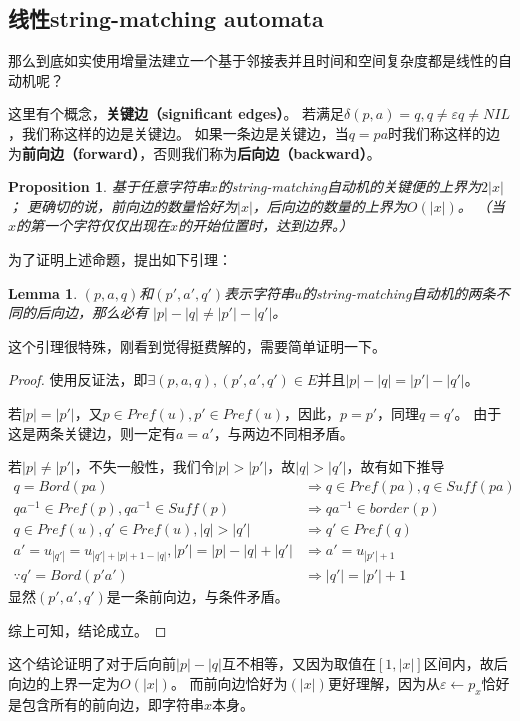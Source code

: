 \documentclass[UTF8]{ctexart}
\newtheorem{lem}[thm]{Lemma}
\newtheorem{prop}[thm]{Proposition}
\theoremstyle{definition}
\theoremstyle{remark}
\numberwithin{equation}{subsection}
\newcommand{\Emph}{\textbf}
\newcommand{\Suff}{\textit{Suff}}
\begin{document}
\subsection{线性string-matching automata}
	
	那么到底如实使用增量法建立一个基于邻接表并且时间和空间复杂度都是线性的自动机呢？
	
	这里有个概念，\Emph{关键边（significant edges）}。
	若满足$\delta(p,a)=q, q \neq \varepsilon q \neq NIL$，我们称这样的边是关键边。
	如果一条边是关键边，当$q=pa$时我们称这样的边为\Emph{前向边（forward）}，否则我们称为\Emph{后向边（backward）}。
	
	\begin{prop}
		基于任意字符串$x$的string-matching自动机的关键便的上界为$2|x|$；
		更确切的说，前向边的数量恰好为$|x|$，后向边的数量的上界为$O(|x|)$。
		（当$x$的第一个字符仅仅出现在$x$的开始位置时，达到边界。）
	\end{prop}
	为了证明上述命题，提出如下引理：
	\begin{lem}
		$(p,a,q)$和$(p',a',q')$表示字符串$u$的string-matching自动机的两条不同的后向边，那么必有
		$|p| - |q| \neq |p'| - |q'|$。
	\end{lem}
	这个引理很特殊，刚看到觉得挺费解的，需要简单证明一下。
	\begin{proof}
		使用反证法，即$\exists (p,a,q),(p',a',q') \in E$并且$|p|-|q| = |p'|-|q'|$。
		
		若$|p|=|p'|$，又$p \in Pref(u), p' \in Pref(u)$，因此，$p = p'$，同理$q = q'$。
		由于这是两条关键边，则一定有$a=a'$，与两边不同相矛盾。
		
		若$|p| \neq |p'|$，不失一般性，我们令$|p| > |p'|$，故$|q| > |q'|$，故有如下推导
		\begin{align*}
			q = Bord(pa)	&\Rightarrow q \in Pref(pa), q \in \Suff(pa)	\\
			qa^{-1} \in Pref(p), qa^{-1} \in \Suff(p)	&\Rightarrow qa^{-1} \in border(p)	\\
			q \in Pref(u), q' \in Pref(u), |q|>|q'| &\Rightarrow q' \in Pref(q)	\\
			a' = u_{|q'|} = u_{|q'|+|p|+1-|q|}, |p'|=|p|-|q|+|q'| &\Rightarrow a' = u_{|p'|+1}	\\
			\because q' = Bord(p'a') &\Rightarrow |q'|=|p'|+1
		\end{align*}
		显然$(p',a',q')$是一条前向边，与条件矛盾。
		
		综上可知，结论成立。
	\end{proof}
	这个结论证明了对于后向前$|p|-|q|$互不相等，又因为取值在$[1,|x|]$区间内，故后向边的上界一定为$O(|x|)$。
	而前向边恰好为$(|x|)$更好理解，因为从$\varepsilon \leftarrow p_{x}$恰好是包含所有的前向边，即字符串$x$本身。
	
\end{document}
